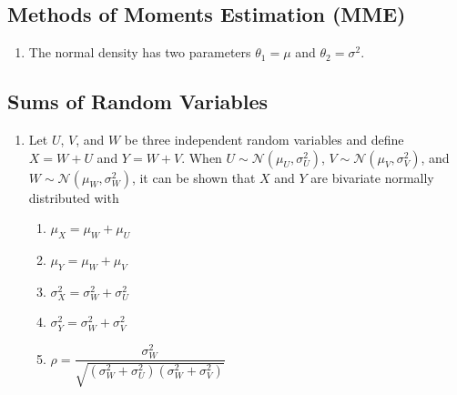 \subsection{Methods of Moments Estimation (MME)}

\begin{enumerate}
    \item The normal density has two parameters $\theta_1 = \mu$ and $\theta_2 = \sigma^ 2$.
    \hfill \cite{statistics/book/Statistics-for-Data-Scientists/Maurits-Kaptein}


\end{enumerate}


\subsection{Sums of Random Variables}

\begin{enumerate}
    \item Let $U$, $V$, and $W$ be three independent random variables and define $X = W + U$ and $Y = W + V$. 
    When $U \sim \mathcal{N} (\mu_U , \sigma^2_U )$, $V \sim \mathcal{N} (\mu_V , \sigma^2_V )$, and $W \sim \mathcal{N} (\mu_W , \sigma^2_W )$, it can be shown that $X$ and $Y$ are bivariate normally distributed with
    \hfill \cite{statistics/book/Statistics-for-Data-Scientists/Maurits-Kaptein}
    \begin{multicols}{2}
    \begin{enumerate}
        \item $\mu _X = \mu _W + \mu _U$
        \hfill \cite{statistics/book/Statistics-for-Data-Scientists/Maurits-Kaptein}
        
        \item $\mu _Y = \mu _W + \mu _V$
        \hfill \cite{statistics/book/Statistics-for-Data-Scientists/Maurits-Kaptein}
        
        \item $\sigma ^2_X = \sigma ^2_W + \sigma ^2_U$
        \hfill \cite{statistics/book/Statistics-for-Data-Scientists/Maurits-Kaptein}
        
        \item $\sigma ^2_Y = \sigma ^2_W + \sigma ^2_V$
        \hfill \cite{statistics/book/Statistics-for-Data-Scientists/Maurits-Kaptein}
        
        \item $\rho = \dfrac{\sigma ^2_W }{\sqrt{(\sigma ^2_W + \sigma ^2_U )(\sigma ^2_W + \sigma ^2_V )}}$
        \hfill \cite{statistics/book/Statistics-for-Data-Scientists/Maurits-Kaptein}
    \end{enumerate}
    \end{multicols}
\end{enumerate}

















